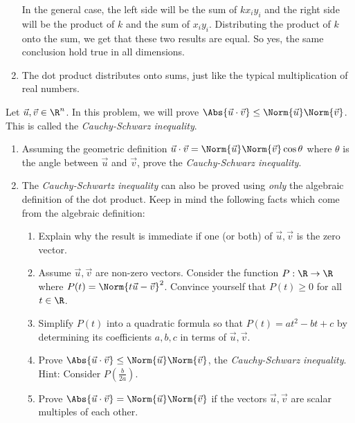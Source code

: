 \begin{exercises}
\begin{problist}
\begin{solution}
\begin{enumerate}
				In the general case, the left side will be the sum of $kx_iy_i$ and the right side will 
				be the product of $k$ and the sum of $x_iy_i$. Distributing the product of $k$ onto the 
				sum, we get that these two results are equal. So yes, the same conclusion hold true in 
				all dimensions.
				
				\item The dot product distributes onto sums, just like the typical multiplication of 
				real numbers.
			\end{enumerate}
		\end{solution}
	
        	\prob Let $\vec u, \vec v \in \R^{n}$. In this problem, we will prove
		$\Abs{\vec u \cdot \vec v}\leq \Norm{\vec u}\Norm{\vec v}$. This is called
		the \emph{Cauchy-Schwarz inequality}.
		\begin{enumerate}
			\item Assuming the geometric definition
				$\vec u \cdot \vec v = \Norm{\vec u}\Norm{\vec v}\cos \theta$
				where $\theta$ is the angle between $\vec u$ and $\vec v$, prove
				the \emph{Cauchy-Schwarz inequality}.

			\item The \emph{Cauchy-Schwartz inequality} can also be proved using
				\emph{only} the algebraic definition of the dot product. Keep in
				mind the following facts which come from the algebraic definition:

				\begin{enumerate}
					\item Explain why the result is immediate if one (or both)
						of $\vec u, \vec v$ is the zero vector.

					\item Assume $\vec u, \vec v$ are non-zero vectors. Consider
						the function $P: \R \to \R$ where $P(t) = \Norm
						{t\vec u - \vec v}^{2}$. Convince yourself that
						$P(t) \geq 0$ for all $t \in \R$.

					\item Simplify $P(t)$ into a quadratic formula so that
						$P(t) = at^{2}- bt + c$ by determining its coefficients
						$a, b, c$ in terms of $\vec u, \vec v$.

					\item Prove
						$\Abs{\vec u \cdot \vec v}\leq \Norm{\vec u}\Norm
						{\vec v}$, the \emph{Cauchy-Schwarz inequality}. Hint: Consider
						$P(\frac{b}{2a})$.

					\item Prove
						$\Abs{\vec u \cdot \vec v}= \Norm{\vec u}\Norm{\vec v}$
						if the vectors $\vec u, \vec v$ are scalar multiples of
						each other.
				\end{enumerate}
		\end{enumerate}


\end{problist}
\end{exercises}
